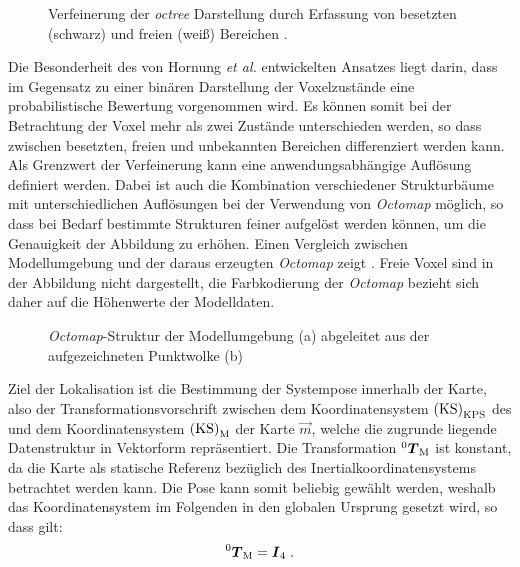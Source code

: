 \begin{figure}[!ht]
	\begin{center}
	\hspace{5mm}
	\caption{Verfeinerung der \textit{octree} Darstellung durch Erfassung von besetzten (schwarz) und freien (weiß) Bereichen \cite{Hornung2013}. }
	\label{fig.octree}
	\end{center}
\end{figure}

Die Besonderheit des von Hornung \textit{et al.} entwickelten Ansatzes liegt darin, dass im Gegensatz zu einer binären Darstellung der Voxelzustände eine probabilistische Bewertung vorgenommen wird. Es können somit bei der Betrachtung der Voxel mehr als zwei Zustände unterschieden werden, so dass zwischen besetzten, freien und unbekannten Bereichen differenziert werden kann. Als Grenzwert der Verfeinerung kann eine anwendungsabhängige Auflösung definiert werden. Dabei ist auch die Kombination verschiedener Strukturbäume mit unterschiedlichen Auflösungen bei der Verwendung von \textit{Octomap} möglich, so dass bei Bedarf bestimmte Strukturen feiner aufgelöst werden können, um die Genauigkeit der Abbildung zu erhöhen. Einen Vergleich zwischen Modellumgebung und der daraus erzeugten \textit{Octomap} zeigt . Freie Voxel sind in der Abbildung nicht dargestellt, die Farbkodierung der \textit{Octomap} bezieht sich daher auf die Höhenwerte der Modelldaten.

\begin{figure}[!ht]
	\begin{center}
	\hspace{5mm}
	\caption{\textit{Octomap}-Struktur der Modellumgebung (a) abgeleitet aus der aufgezeichneten Punktwolke (b)}
	\label{fig.octomap}
	\end{center}
\end{figure}%

\clearpage{}

Ziel der Lokalisation ist die Bestimmung der Systempose innerhalb der Karte, also der Transformationsvorschrift zwischen dem Koordinatensystem ${\mathrm{(KS)}}_{\mathrm{KPS}}$ des  und dem Koordinatensystem ${\mathrm{(KS)}}_{\mathrm{M}}$ der Karte $\vec{m}$, welche die zugrunde liegende Datenstruktur in Vektorform repräsentiert. Die Transformation ${^{\mathrm{0}}\mbox{\boldmath{$T$}}_{\mathrm{M}}}$ ist konstant, da die Karte als statische Referenz bezüglich des Inertialkoordinatensystems betrachtet werden kann. Die Pose kann somit beliebig gewählt werden, weshalb das Koordinatensystem im Folgenden in den globalen Ursprung gesetzt wird, so dass gilt:
%
\begin{equation}
{^{\mathrm{0}}\mbox{\boldmath{$T$}}_{\mathrm{M}}} = \mbox{\boldmath{$I$}}_{\mathrm{4}} \; \text{.}
\end{equation}


